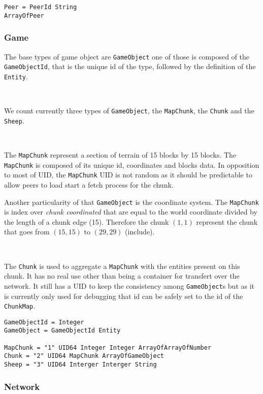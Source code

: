\begin{lstlisting}
Peer = PeerId String
ArrayOfPeer
\end{lstlisting}


\subsubsection{Game}
The base types of game object are \verb+GameObject+ one of those is composed of
the \verb+GameObjectId+, that is the unique id of the type, followed by the
definition of the \verb+Entity+.

~

We count currently three types of \verb+GameObject+, the \verb+MapChunk+, the
\verb+Chunk+ and the \verb+Sheep+.

~

The \verb+MapChunk+ represent a section of terrain of 15 blocks by 15 blocks. The \verb+MapChunk+ is composed of its unique id, coordinates and blocks data. In opposition to most of UID, the \verb+MapChunk+ UID is not random as it should be predictable to allow peers to load start a fetch process for the chunk.

Another particularity of that \verb+GameObject+ is the coordinate system. The \verb+MapChunk+ is index over \textit{chunk coordinated} that are equal to the world coordinate divided by the length of a chunk edge (15). Therefore the chunk $(1,1)$ represent the chunk that goes from $(15, 15)$ to $(29,29)$ (include).

~

The \verb+Chunk+ is used to aggregate a \verb+MapChunk+ with the entities present on this chunk. It has no real use other than being a container for transfert over the network. It still has a UID to keep the consistency among \verb+GameObject+s but as it is currently only used for debugging that id can be safely set to the id of the \verb+ChunkMap+.

\begin{lstlisting}
GameObjectId = Integer
GameObject = GameObjectId Entity

MapChunk = "1" UID64 Integer Integer ArrayOfArrayOfNumber
Chunk = "2" UID64 MapChunk ArrayOfGameObject
Sheep = "3" UID64 Interger Interger String
\end{lstlisting}

\subsubsection{Network}

